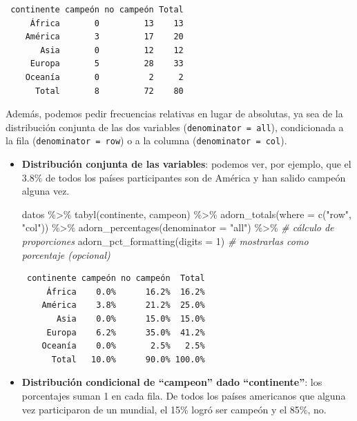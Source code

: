 \documentclass[
]{book}
\newenvironment{Shaded}{\begin{snugshade}}{\end{snugshade}}
\newcommand{\AttributeTok}[1]{\textcolor[rgb]{0.77,0.63,0.00}{#1}}
\newcommand{\CommentTok}[1]{\textcolor[rgb]{0.56,0.35,0.01}{\textit{#1}}}
\newcommand{\DecValTok}[1]{\textcolor[rgb]{0.00,0.00,0.81}{#1}}
\newcommand{\FunctionTok}[1]{\textcolor[rgb]{0.00,0.00,0.00}{#1}}
\newcommand{\NormalTok}[1]{#1}
\newcommand{\SpecialCharTok}[1]{\textcolor[rgb]{0.00,0.00,0.00}{#1}}
\newcommand{\StringTok}[1]{\textcolor[rgb]{0.31,0.60,0.02}{#1}}
\begin{document}
\begin{verbatim}
 continente campeón no campeón Total
     África       0         13    13
    América       3         17    20
       Asia       0         12    12
     Europa       5         28    33
    Oceanía       0          2     2
      Total       8         72    80
\end{verbatim}

Además, podemos pedir frecuencias relativas en lugar de absolutas, ya sea de la distribución conjunta de las dos variables (\texttt{denominator\ =\ all}), condicionada a la fila (\texttt{denominator\ =\ row}) o a la columna (\texttt{denominator\ =\ col}).

\begin{itemize}
\item
  \textbf{Distribución conjunta de las variables}: podemos ver, por ejemplo, que el 3.8\% de todos los países participantes son de América y han salido campeón alguna vez.

\begin{Shaded}
\begin{Highlighting}[]
\NormalTok{datos }\SpecialCharTok{\%\textgreater{}\%} 
  \FunctionTok{tabyl}\NormalTok{(continente, campeon) }\SpecialCharTok{\%\textgreater{}\%} 
  \FunctionTok{adorn\_totals}\NormalTok{(}\AttributeTok{where =} \FunctionTok{c}\NormalTok{(}\StringTok{"row"}\NormalTok{, }\StringTok{"col"}\NormalTok{)) }\SpecialCharTok{\%\textgreater{}\%} 
  \FunctionTok{adorn\_percentages}\NormalTok{(}\AttributeTok{denominator =} \StringTok{"all"}\NormalTok{) }\SpecialCharTok{\%\textgreater{}\%}  \CommentTok{\# cálculo de proporciones}
  \FunctionTok{adorn\_pct\_formatting}\NormalTok{(}\AttributeTok{digits =} \DecValTok{1}\NormalTok{)            }\CommentTok{\# mostrarlas como porcentaje (opcional)}
\end{Highlighting}
\end{Shaded}

\begin{verbatim}
 continente campeón no campeón  Total
     África    0.0%      16.2%  16.2%
    América    3.8%      21.2%  25.0%
       Asia    0.0%      15.0%  15.0%
     Europa    6.2%      35.0%  41.2%
    Oceanía    0.0%       2.5%   2.5%
      Total   10.0%      90.0% 100.0%
\end{verbatim}
\item
  \textbf{Distribución condicional de ``campeon'' dado ``continente''}: los porcentajes suman 1 en cada fila. De todos los países americanos que alguna vez participaron de un mundial, el 15\% logró ser campeón y el 85\%, no.


\end{itemize}
\end{document}
